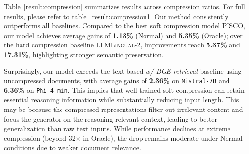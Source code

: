 \documentclass{applemlr}
\numberwithin{equation}{section}
\begin{document}
Table~\ref{result:compression} summarizes results across compression ratios. For full results, please refer to table~\ref{result:compression1} Our method consistently outperforms all baselines.
Compared to the best soft compression model \textsc{PISCO}, our model achieves average gains of \textbf{1.13\%} (Normal) and \textbf{5.35\%} (Oracle); over the hard compression baseline \textsc{LLMLingual-2}, improvements reach \textbf{5.37\%} and \textbf{17.31\%}, highlighting stronger semantic preservation.

Surprisingly, our model  exceeds the text-based \textit{w/ BGE retrieval} baseline using uncompressed documents,
with average gains of \textbf{2.36\%} on \texttt{Mistral-7B} and \textbf{6.36\%} on \texttt{Phi-4-min}. This implies that well-trained soft compression can retain essential reasoning information while substantially reducing input length. This may be because the compressed representations filter out irrelevant content and focus the generator on the reasoning-relevant context, leading to better generalization than raw text inputs.
While performance declines at extreme compression (beyond 32× in Oracle), the drop remains moderate under Normal conditions due to weaker document relevance.
\end{document}
